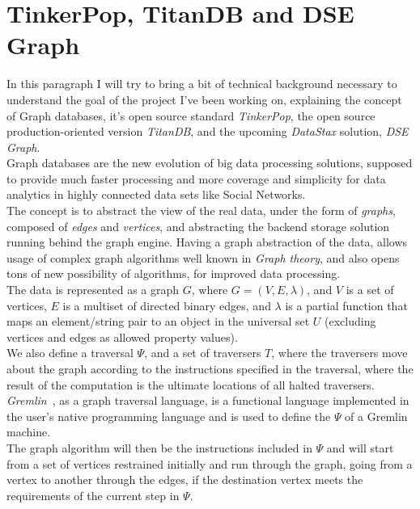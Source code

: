 \documentclass[a4paper]{report}
\newcommand{\ds}{\emph{DataStax\xspace}}
\newcommand{\dseg}{\emph{DSE Graph\xspace}}
\newcommand{\tdb}{\emph{TitanDB\xspace}}
\begin{document}
\section{TinkerPop, TitanDB and DSE Graph}
In this paragraph I will try to bring a bit of technical background necessary to understand the goal of the project I've been working on, explaining the concept of Graph databases, it's open source standard \emph{TinkerPop}, the open source production-oriented version \tdb{}, and the upcoming \ds{} solution, \dseg{}.\\
Graph databases are the new evolution of big data processing solutions, supposed to provide much faster processing and more coverage and simplicity for data analytics in highly connected data sets like Social Networks.\\
The concept is to abstract the view of the real data, under the form of \emph{graphs}, composed of \emph{edges} and \emph{vertices}, and abstracting the backend storage solution running behind the graph engine. Having a graph abstraction of the data, allows usage of complex graph algorithms well known in \emph{Graph theory}, and also opens tons of new possibility of algorithms, for improved data processing.\\
The data is represented as a graph $G$, where $G = (V, E, \lambda)$, and $V$ is a set of vertices, $E$ is a multiset of directed binary edges, and $\lambda$ is a partial function that maps an element/string pair to an object in the universal set $U$ (excluding vertices and edges as allowed property values).\\
We also define a traversal $\Psi$, and a set of traversers $T$, where the traversers move about the graph according to the instructions specified in the traversal, where the result of the computation is the ultimate locations of all halted traversers.\\
\emph{Gremlin}~\cite{Rodriguez}, as a graph traversal language, is a functional language implemented in the user's native programming language and is used to define the $\Psi$ of a Gremlin machine.\\ 
The graph algorithm will then be the instructions included in $\Psi$ and will start from a set of vertices restrained initially and run through the graph, going from a vertex to another through the edges, if the destination vertex meets the requirements of the current step in $\Psi$.\\
\end{document}
